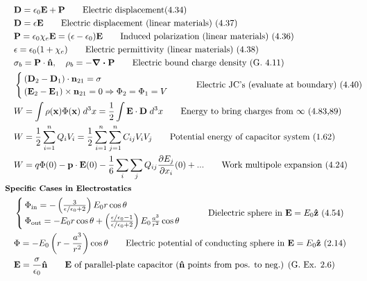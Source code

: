 \documentclass[10pt]{article}
\newcommand{\zhat}{\boldsymbol{\hat{\textbf{z}}}}
\newcommand{\nhat}{\boldsymbol{\hat{\textbf{n}}}}
\newcommand{\ve}[1]{\boldsymbol{\mathbf{#1}}}
\newcommand{\vect}[1]{\boldsymbol{\mathbf{#1}}}
\newcommand{\eo}{\epsilon_0}
\newcommand{\pder}[2]{\frac{\partial #1}{\partial #2}}
\begin{document}
\begin{multicols}{2}
\begin{align*}
		& \vect{D} = \eo \vect{E} + \vect{P} \tag*{Electric displacement(4.34)} \\
		& \vect{D} = \epsilon \vect{E} \tag*{Electric displacement (linear materials) (4.37)} \\
		& \vect{P} = \eo \chi_e \vect{E} = (\epsilon - \eo) \ve{E} \tag*{Induced polarization (linear materials) (4.36)} \\
		& \epsilon = \eo (1 + \chi_e) \tag*{Electric permittivity (linear materials) (4.38)} \\
		& \sigma_b = \ve{P} \cdot \nhat, \quad \rho_b = - \ve{\nabla \cdot P} \tag*{Electric bound charge density (G. 4.11)} \\
		& \begin{cases}
			(\vect{D}_2 - \vect{D}_1) \cdot \vect{n}_{21} = \sigma \\
			(\vect{E}_2 - \vect{E}_1) \times \vect{n}_{21} = 0 \Rightarrow \Phi_2 = \Phi_1 = V \\
		\end{cases}	\tag*{Electric JC's (evaluate at boundary) (4.40)} \\		
		& W = \int \rho(\vect{x}) \Phi(\vect{x})\; d^3x = \frac{1}{2} \int \vect{E} \cdot \vect{D} \; d^3x \tag*{Energy to bring charges from $\infty$ (4.83,89)} \\
		& W = \frac{1}{2} \sum_{i=1}^{n} Q_i V_i = \frac{1}{2} \sum_{i=1}^n \sum_{j=1}^{n} C_{ij} V_i V_j	\tag*{Potential energy of capacitor system (1.62)} \\	
		& W = q \Phi(0) - \vect{p} \cdot \vect{E}(0) - \frac{1}{6} \sum_i \sum_j Q_{ij} \pder{E_j}{x_i}(0) + ... \tag*{Work multipole expansion (4.24)} \\
	& \small \hspace{-10pt} \textbf{Specific Cases in Electrostatics} \small \\
		&\begin{cases}
			\Phi_{\text{in}} = - \left( \frac{3}{\epsilon/\eo + 2} \right) E_0 r \cos \theta \\ 
			\Phi_{\text{out}} = - E_0 r \cos \theta + \left( \frac{\epsilon/\eo - 1}{\epsilon/\eo + 2} \right) E_0 \frac{a^3}{r^2} \cos \theta 
		\end{cases} \tag*{Dielectric sphere in $\vect{E} = E_0 \zhat$ (4.54)} \\
		& \Phi = -E_0 \left( r - \frac{a^3}{r^2} \right) \cos \theta	\tag*{Electric potential of conducting sphere in $\vect{E} = E_0 \zhat$ (2.14)} \\
		& \ve{E} = \frac{\sigma}{\eo} \nhat \tag*{$\ve{E}$ of parallel-plate capacitor ($\nhat$ points from pos. to neg.) (G. Ex. 2.6)} \\

\end{align*}
\end{multicols}
\end{document}
